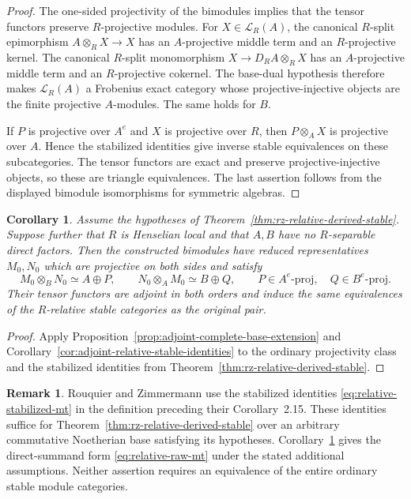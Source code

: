 \documentclass[12pt,a4paper,english,reqno]{amsart}
\numberwithin{equation}{section}
\theoremstyle{plain}
\newtheorem{corollary}[theorem]{Corollary}
\theoremstyle{definition}
\newtheorem{remark}[theorem]{Remark}
\begin{document}
\begin{proof}
The one-sided projectivity of the bimodules implies that the
tensor functors preserve $R$-projective modules.  For
$X\in\mathcal L_R(A)$, the canonical $R$-split epimorphism
$A\otimes_RX\to X$ has an $A$-projective middle term and an
$R$-projective kernel.  The canonical $R$-split monomorphism
$X\to D_RA\otimes_RX$ has an $A$-projective middle term and an
$R$-projective cokernel.  The base-dual hypothesis therefore
makes $\mathcal L_R(A)$ a Frobenius exact category whose
projective-injective objects are the finite projective
$A$-modules.  The same holds for $B$.

If $P$ is projective over $A^e$ and $X$ is projective over $R$,
then $P\otimes_AX$ is projective over $A$.  Hence the stabilized
identities give inverse stable equivalences on these
subcategories.  The tensor functors are exact and preserve
projective-injective objects, so these are triangle equivalences.
The last assertion follows from the displayed bimodule
isomorphisms for symmetric algebras.
\end{proof}

\begin{corollary}\label{cor:rz-henselian-adjoint-type}
Assume the hypotheses of
Theorem~\ref{thm:rz-relative-derived-stable}.  Suppose further
that $R$ is Henselian local and that $A,B$ have no
$R$-separable direct factors.  Then the constructed bimodules
have reduced representatives $M_0,N_0$ which are projective on
both sides and satisfy
\[
 M_0\otimes_BN_0\simeq A\oplus P,
 \qquad N_0\otimes_AM_0\simeq B\oplus Q,
 \qquad P\in A^e\text{-}\mathrm{proj},\quad
        Q\in B^e\text{-}\mathrm{proj}.
\]
Their tensor functors are adjoint in both orders and induce the
same equivalences of the $R$-relative stable categories as the
original pair.
\end{corollary}

\begin{proof}
Apply Proposition~\ref{prop:adjoint-complete-base-extension} and
Corollary~\ref{cor:adjoint-relative-stable-identities} to the
ordinary projectivity class and the stabilized identities
from Theorem~\ref{thm:rz-relative-derived-stable}.
\end{proof}

\begin{remark}
Rouquier and Zimmermann use the stabilized identities
\eqref{eq:relative-stabilized-mt} in the definition preceding
their Corollary~2.15.  These identities suffice for
Theorem~\ref{thm:rz-relative-derived-stable} over an arbitrary
commutative Noetherian base satisfying its hypotheses.
Corollary~\ref{cor:rz-henselian-adjoint-type} gives the
direct-summand form \eqref{eq:relative-raw-mt} under the stated
additional assumptions.  Neither assertion requires an
equivalence of the entire ordinary stable module categories.
\end{remark}
\end{document}
